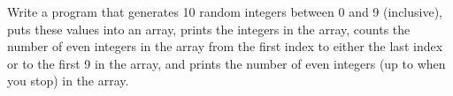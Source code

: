 Write a program that generates 10 random integers between 0 and 9 (inclusive), puts these values into an array, prints the integers in the array, counts the number of even integers in the array from the first index to either the last index or to the first 9 in the array, and prints the number of even integers (up to when you stop) in the array.


